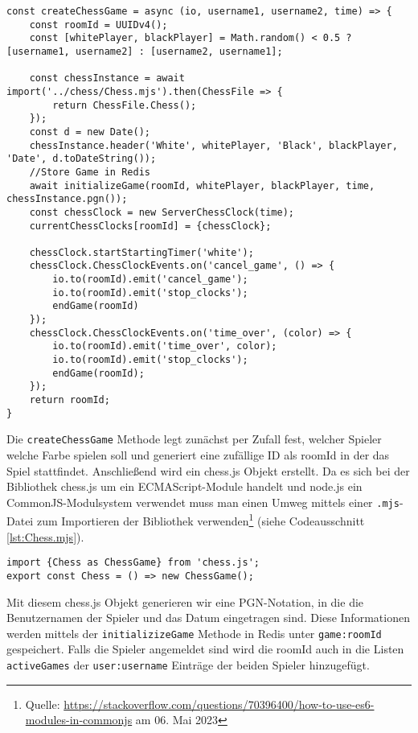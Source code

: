 \begin{lstlisting}[style=codeStyle, caption={Die createChessGame Methode zum Initialisieren einer Schachpartie}, label={lst:createChessGame}]
const createChessGame = async (io, username1, username2, time) => {
    const roomId = UUIDv4();
    const [whitePlayer, blackPlayer] = Math.random() < 0.5 ? [username1, username2] : [username2, username1];

    const chessInstance = await import('../chess/Chess.mjs').then(ChessFile => {
        return ChessFile.Chess();
    });
    const d = new Date();
    chessInstance.header('White', whitePlayer, 'Black', blackPlayer, 'Date', d.toDateString());
    //Store Game in Redis
    await initializeGame(roomId, whitePlayer, blackPlayer, time, chessInstance.pgn());
    const chessClock = new ServerChessClock(time);
    currentChessClocks[roomId] = {chessClock};

    chessClock.startStartingTimer('white');
    chessClock.ChessClockEvents.on('cancel_game', () => {
        io.to(roomId).emit('cancel_game');
        io.to(roomId).emit('stop_clocks');
        endGame(roomId)
    });
    chessClock.ChessClockEvents.on('time_over', (color) => {
        io.to(roomId).emit('time_over', color);
        io.to(roomId).emit('stop_clocks');
        endGame(roomId);
    });
    return roomId;
}
\end{lstlisting}

Die \verb|createChessGame| Methode legt zunächst per Zufall fest, welcher Spieler welche Farbe spielen soll und generiert eine zufällige ID als roomId in der das Spiel stattfindet. Anschließend wird ein chess.js Objekt erstellt. Da es sich bei der Bibliothek chess.js um ein ECMAScript-Module handelt und node.js ein CommonJS-Modulsystem verwendet muss man einen Umweg mittels einer \verb|.mjs|-Datei zum Importieren der Bibliothek verwenden\footnote{Quelle: \url{https://stackoverflow.com/questions/70396400/how-to-use-es6-modules-in-commonjs} am 06. Mai 2023} (siehe Codeausschnitt \ref{lst:Chess.mjs}).

\begin{lstlisting}[style=codeStyle, caption={Die Chess.mjs Datei}, label={lst:Chess.mjs}]
import {Chess as ChessGame} from 'chess.js';
export const Chess = () => new ChessGame();
\end{lstlisting}

Mit diesem chess.js Objekt generieren wir eine PGN-Notation, in die die Benutzernamen der Spieler und das Datum eingetragen sind. Diese Informationen werden mittels der \verb|initializizeGame| Methode in Redis unter \verb|game:roomId| gespeichert. Falls die Spieler angemeldet sind wird die roomId auch in die Listen \verb|activeGames| der \verb|user:username| Einträge der beiden Spieler hinzugefügt. 


